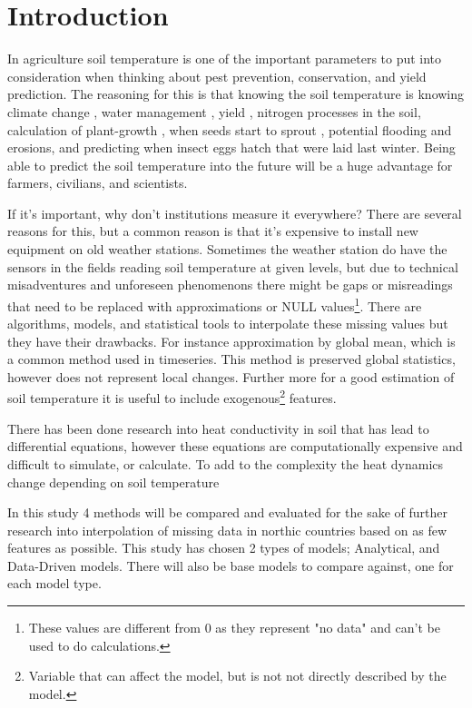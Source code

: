 \section{Introduction}

In agriculture soil temperature is one of the important parameters to put into consideration when thinking about pest prevention, conservation, and yield prediction. The reasoning for this is that knowing the soil temperature is knowing climate change \cite{li_attention-aware_2022}, water management \cite{alizamir_advanced_2020}, yield \cite{sim_prediction_2020}, nitrogen processes \cite{rankinen_simple_2004} in the soil, calculation of plant-growth \cite{li_modeling_2020}, when seeds start to sprout \cite{li_modeling_2020}, potential flooding and erosions\cite{stuurop_influence_2022}, and predicting when insect eggs hatch that were laid last winter. Being able to predict the soil temperature into the future will be a huge advantage for farmers, civilians, and scientists.

If it's important, why don't institutions measure it everywhere? There are several reasons for this, but a common reason is that it's expensive to install new equipment on old weather stations. Sometimes the weather station do have the sensors in the fields reading soil temperature at given levels, but due to technical misadventures and unforeseen phenomenons there might be gaps or misreadings that need to be replaced with approximations or NULL values\footnote{These values are different from 0 as they represent "no data" and can't be used to do calculations.}. There are algorithms, models, and statistical tools to interpolate these missing values but they have their drawbacks. For instance approximation by global mean, which is a common method used in timeseries\cite{lepot_interpolation_2017}. This method is preserved global statistics, however does not represent local changes. Further more for a good estimation of soil temperature it is useful to include exogenous\footnote{Variable that can affect the model, but is not not directly described by the model.} features.

There has been done research into heat conductivity in soil that has lead to differential equations\cite{karvonen_model_1988}, however these equations\cite{fourier_analytical_2009,karvonen_model_1988} are computationally expensive and difficult to simulate, or calculate\cite{rankinen_simple_2004}. To add to the complexity the heat dynamics change depending on soil temperature

In this study 4 methods will be compared and evaluated for the sake of further research into interpolation of missing data in northic countries based on as few features as possible. This study has chosen 2 types of models; Analytical, and Data-Driven models. There will also be base models to compare against, one for each model type. 

